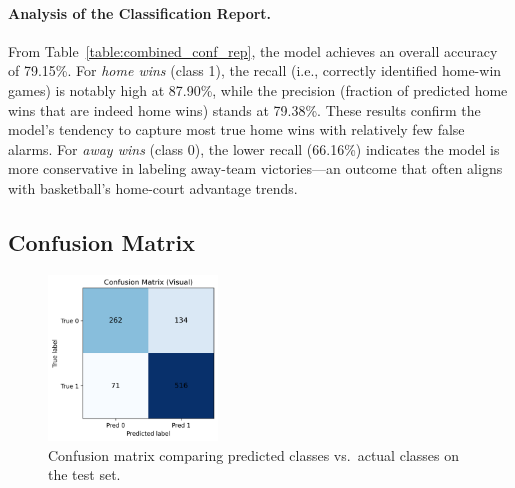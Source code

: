 \documentclass[12pt]{article}
\begin{document}
\paragraph{Analysis of the Classification Report.}
From Table~\ref{table:combined_conf_rep}, the model achieves an overall accuracy of 79.15\%. For \textit{home wins} (class 1), the recall (i.e., correctly identified home-win games) is notably high at 87.90\%, while the precision (fraction of predicted home wins that are indeed home wins) stands at 79.38\%. These results confirm the model’s tendency to capture most true home wins with relatively few false alarms. For \textit{away wins} (class 0), the lower recall (66.16\%) indicates the model is more conservative in labeling away-team victories—an outcome that often aligns with basketball’s home-court advantage trends.

\subsection{Confusion Matrix}
\begin{figure}[H]
\centering
\includegraphics[width=0.4\textwidth]{graph_confusion_matrix.png}
\caption{Confusion matrix comparing predicted classes vs.\ actual classes on the test set.}
\label{fig:confusion_matrix}
\end{figure}
\end{document}
